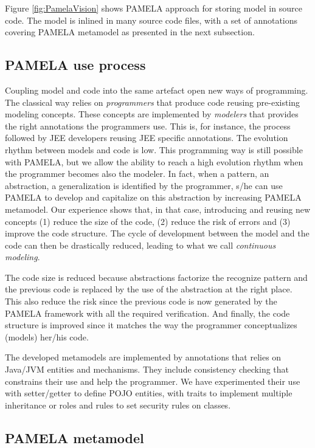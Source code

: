 Figure \ref{fig:PamelaVision} shows PAMELA approach for storing model in source code. The model is inlined in many source code files, with a set of annotations covering PAMELA metamodel as presented in the next subsection.

\subsection{PAMELA use process}

Coupling model and code into the same artefact open new ways of programming. The classical way relies on \emph{programmers} that produce code reusing pre-existing modeling concepts. These concepts are implemented by \emph{modelers} that provides the right annotations the programmers use. This is, for instance, the process followed by JEE developers reusing JEE specific annotations. The evolution rhythm between models and code is low. This programming way is still possible with PAMELA, but we allow the ability to reach a high evolution rhythm when the programmer becomes also the modeler. In fact, when a pattern, an abstraction, a generalization is identified by the programmer, s/he can use PAMELA to develop and capitalize on this abstraction by increasing PAMELA metamodel. Our experience shows that, in that case, introducing and reusing new concepts (1) reduce the size of the code, (2) reduce the risk of errors and (3) improve the code structure. The cycle of development between the model and the code can then be drastically reduced, leading to what we call \emph{continuous modeling}.

The code size is reduced because abstractions factorize the recognize pattern and the previous code is replaced by the use of the abstraction at the right place. This also reduce the risk since the previous code is now generated by the PAMELA framework with all the required verification. And finally, the code structure is improved since it matches the way the programmer conceptualizes (models) her/his code. 

The developed metamodels are implemented by annotations that relies on Java/JVM entities and mechanisms. They include consistency checking that constrains their use and help the programmer. We have experimented their use with setter/getter to define POJO entities, with traits to implement multiple inheritance or roles and rules to set security rules on classes.

\subsection{PAMELA metamodel}

